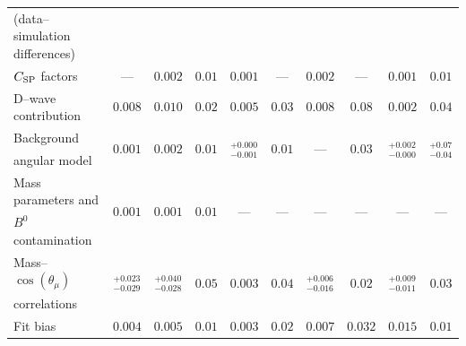 \documentclass[12pt,a4paper]{article}
\def\cosTmu  {\ensuremath{\cos(\theta_{\mu})}\xspace}
\newcommand{\Bd}{\ensuremath{B^0}\xspace}
\newcommand{\dwave}{{\rm D--wave}\xspace}
\begin{document}
\begin{table}[htbp]
\begin{center}
\begin{tabular}{lccccccccc}
{\scriptsize(data--simulation differences)}             & & & & & & & & & \\
\multirow{2}{*}{$C_{\rm SP}$ factors}     & \multirow{2}{*}{---} & \multirow{2}{*}{$0.002$} & \multirow{2}{*}{$0.01$} & \multirow{2}{*}{$0.001$} & \multirow{2}{*}{---} & \multirow{2}{*}{$0.002$} & \multirow{2}{*}{---} & \multirow{2}{*}{$0.001$} & \multirow{2}{*}{$0.01$} \\
                        & & & & & & & & & \\
\multirow{2}{*}{\dwave contribution}  & \multirow{2}{*}{$0.008$} & \multirow{2}{*}{$0.010$} & \multirow{2}{*}{$0.02$}& \multirow{2}{*}{$0.005$}& \multirow{2}{*}{$0.03$}& \multirow{2}{*}{$0.008$} & \multirow{2}{*}{$0.08$} & \multirow{2}{*}{$0.002$} & \multirow{2}{*}{$0.04$} \\                    
                           & & & & & & & & & \\
Background                  & \multirow{2}{*}{$0.001$} & \multirow{2}{*}{$	0.002	$} & \multirow{2}{*}{$0.01$}& \multirow{2}{*}{$^{+	0.000	}_{-	0.001	}$}& \multirow{2}{*}{$0.01$}& \multirow{2}{*}{---} & \multirow{2}{*}{$0.03$} & \multirow{2}{*}{$^{+	0.002	}_{-	0.000	}$} & \multirow{2}{*}{$^{+	0.07	}_{-	0.04	}$}\\
angular model                & & & & & & & & & \\
Mass parameters and   & \multirow{2}{*}{$0.001$} & \multirow{2}{*}{$0.001$} & \multirow{2}{*}{$0.01$}& \multirow{2}{*}{---}& \multirow{2}{*}{---} & \multirow{2}{*}{---} & \multirow{2}{*}{---} & \multirow{2}{*}{---} & \multirow{2}{*}{---} \\
\Bd contamination      & & & & & & & & & \\
Mass--\cosTmu   & \multirow{2}{*}{$^{+	0.023	}_{-	0.029	}$} & \multirow{2}{*}{$^{+	0.040	}_{-	0.028	}$} & \multirow{2}{*}{$0.05$}& \multirow{2}{*}{$0.003$}& \multirow{2}{*}{$0.04$}& \multirow{2}{*}{$^{+	0.006	}_{-	0.016	}$} & \multirow{2}{*}{$0.02$} & \multirow{2}{*}{$^{+	0.009	}_{-	0.011	}$} & \multirow{2}{*}{$0.03$}  \\
correlations      & & & & & & & & & \\
\multirow{2}{*}{Fit bias}  & \multirow{2}{*}{$0.004$} & \multirow{2}{*}{$0.005$} & \multirow{2}{*}{$0.01$}& \multirow{2}{*}{$0.003$}& \multirow{2}{*}{$0.02$}& \multirow{2}{*}{$0.007$} & \multirow{2}{*}{$0.032$} & \multirow{2}{*}{$0.015$} & \multirow{2}{*}{$0.01$} \\                    
                           & & & & & & & & & \\

\end{tabular}
\end{center}
\end{table}
\end{document}
